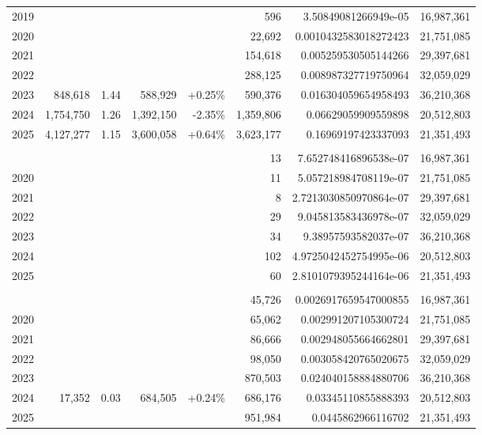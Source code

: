 \begin{table}[!t]
\begin{tabular*}{\linewidth}{@{\extracolsep{\fill}}l|rrrrrrr}
2019 &  &  &  &  & 596 & 3.50849081266949e-05 & 16,987,361 \\
2020 &  &  &  &  & 22,692 & 0.0010432583018272423 & 21,751,085 \\
2021 &  &  &  &  & 154,618 & 0.005259530505144266 & 29,397,681 \\
2022 &  &  &  &  & 288,125 & 0.008987327719750964 & 32,059,029 \\
2023 & 848,618 & 1.44 & 588,929 & +0.25\% & 590,376 & 0.016304059654958493 & 36,210,368 \\
2024 & 1,754,750 & 1.26 & 1,392,150 & -2.35\% & 1,359,806 & 0.06629059909559898 & 20,512,803 \\
2025 & 4,127,277 & 1.15 & 3,600,058 & +0.64\% & 3,623,177 & 0.16969197423337093 & 21,351,493 \\
\midrule\addlinespace[2.5pt]
\multicolumn{8}{l}{Wikimedia} \\[2.5pt] 
\midrule\addlinespace[2.5pt]
2019 &  &  &  &  & 13 & 7.652748416896538e-07 & 16,987,361 \\
2020 &  &  &  &  & 11 & 5.057218984708119e-07 & 21,751,085 \\
2021 &  &  &  &  & 8 & 2.7213030850970864e-07 & 29,397,681 \\
2022 &  &  &  &  & 29 & 9.045813583436978e-07 & 32,059,029 \\
2023 &  &  &  &  & 34 & 9.38957593582037e-07 & 36,210,368 \\
2024 &  &  &  &  & 102 & 4.9725042452754995e-06 & 20,512,803 \\
2025 &  &  &  &  & 60 & 2.8101079395244164e-06 & 21,351,493 \\
\midrule\addlinespace[2.5pt]
\multicolumn{8}{l}{X.AI} \\[2.5pt] 
\midrule\addlinespace[2.5pt]
2019 &  &  &  &  & 45,726 & 0.0026917659547000855 & 16,987,361 \\
2020 &  &  &  &  & 65,062 & 0.002991207105300724 & 21,751,085 \\
2021 &  &  &  &  & 86,666 & 0.002948055664662801 & 29,397,681 \\
2022 &  &  &  &  & 98,050 & 0.003058420765020675 & 32,059,029 \\
2023 &  &  &  &  & 870,503 & 0.024040158884880706 & 36,210,368 \\
2024 & 17,352 & 0.03 & 684,505 & +0.24\% & 686,176 & 0.03345110855888393 & 20,512,803 \\
2025 &  &  &  &  & 951,984 & 0.0445862966116702 & 21,351,493 \\
\bottomrule
\end{tabular*}

\end{table}
